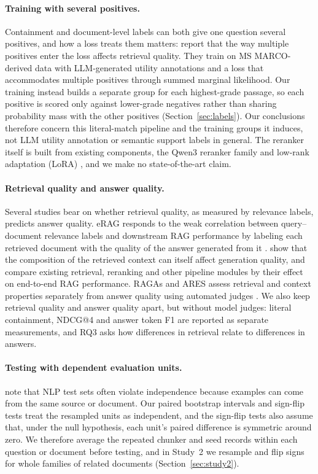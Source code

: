 \paragraph{Training with several positives.} Containment and document-level labels can both give one question several positives, and how a loss treats them matters: \citet{zhang2025utility} report that the way multiple positives enter the loss affects retrieval quality. They train on MS MARCO-derived data with LLM-generated utility annotations and a loss that accommodates multiple positives through summed marginal likelihood. Our training instead builds a separate group for each highest-grade passage, so each positive is scored only against lower-grade negatives rather than sharing probability mass with the other positives (Section~\ref{sec:labels}). Our conclusions therefore concern this literal-match pipeline and the training groups it induces, not LLM utility annotation or semantic support labels in general. The reranker itself is built from existing components, the Qwen3 reranker family \citep{zhang2025qwen} and low-rank adaptation (LoRA) \citep{hu2021}, and we make no state-of-the-art claim.

\paragraph{Retrieval quality and answer quality.} Several studies bear on whether retrieval quality, as measured by relevance labels, predicts answer quality. eRAG responds to the weak correlation between query--document relevance labels and downstream RAG performance by labeling each retrieved document with the quality of the answer generated from it \citep{salemi2024}. \citet{cuconasu2024} show that the composition of the retrieved context can itself affect generation quality, and \citet{wang2024} compare existing retrieval, reranking and other pipeline modules by their effect on end-to-end RAG performance. RAGAs and ARES assess retrieval and context properties separately from answer quality using automated judges \citep{es2024,saad2024}. We also keep retrieval quality and answer quality apart, but without model judges: literal containment, NDCG@4 and answer token F1 are reported as separate measurements, and RQ3 asks how differences in retrieval relate to differences in answers.

\paragraph{Testing with dependent evaluation units.} \citet{dror2018} note that NLP test sets often violate independence because examples can come from the same source or document. Our paired bootstrap intervals and sign-flip tests treat the resampled units as independent, and the sign-flip tests also assume that, under the null hypothesis, each unit's paired difference is symmetric around zero. We therefore average the repeated chunker and seed records within each question or document before testing, and in Study~2 we resample and flip signs for whole families of related documents (Section~\ref{sec:study2}).

